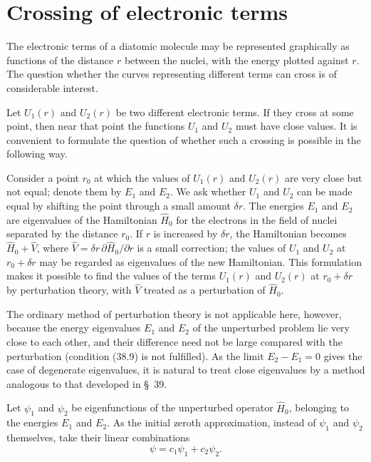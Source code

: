 \section{Crossing of electronic terms}

The electronic terms of a diatomic molecule may be represented graphically as functions of the distance $r$ between the nuclei, with the energy plotted against $r$. The question whether the curves representing different terms can cross is of considerable interest.

Let $U_1(r)$ and $U_2(r)$ be two different electronic terms. If they cross at some point, then near that point the functions $U_1$ and $U_2$ must have close values. It is convenient to formulate the question of whether such a crossing is possible in the following way.

Consider a point $r_0$ at which the values of $U_1(r)$ and $U_2(r)$ are very close but not equal; denote them by $E_1$ and $E_2$. We ask whether $U_1$ and $U_2$ can be made equal by shifting the point through a small amount $\delta r$. The energies $E_1$ and $E_2$ are eigenvalues of the Hamiltonian $\widehat H_0$ for the electrons in the field of nuclei separated by the distance $r_0$. If $r$ is increased by $\delta r$, the Hamiltonian becomes $\widehat H_0+\widehat V$, where $\widehat V=\delta r\,\partial\widehat H_0/\partial r$ is a small correction; the values of $U_1$ and $U_2$ at $r_0+\delta r$ may be regarded as eigenvalues of the new Hamiltonian. This formulation makes it possible to find the values of the terms $U_1(r)$ and $U_2(r)$ at $r_0+\delta r$ by perturbation theory, with $\widehat V$ treated as a perturbation of $\widehat H_0$.

The ordinary method of perturbation theory is not applicable here, however, because the energy eigenvalues $E_1$ and $E_2$ of the unperturbed problem lie very close to each other, and their difference need not be large compared with the perturbation (condition (38.9) is not fulfilled). As the limit $E_2-E_1=0$ gives the case of degenerate eigenvalues, it is natural to treat close eigenvalues by a method analogous to that developed in \S~39.

Let $\psi_1$ and $\psi_2$ be eigenfunctions of the unperturbed operator $\widehat H_0$, belonging to the energies $E_1$ and $E_2$. As the initial zeroth approximation, instead of $\psi_1$ and $\psi_2$ themselves, take their linear combinations
\begin{equation}
 \psi=c_1\psi_1+c_2\psi_2.
 \tag{79.1}
\end{equation}

